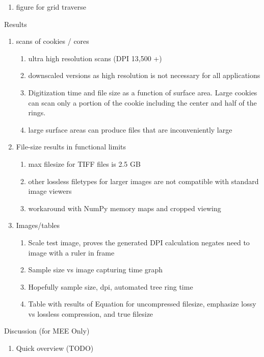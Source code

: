 \documentclass{article}
\begin{document}
\begin{outline}[enumerate]
\begin{enumerate}
\begin{enumerate}
\begin{enumerate}
				\item figure for grid traverse
				\end{enumerate}
			\end{enumerate}
		\end{enumerate}
\item Results
	\begin{enumerate}
	\item scans of cookies / cores
		\begin{enumerate}
		\item ultra high resolution scans (DPI 13,500 +)
		\item downscaled versions as high resolution is not necessary for all applications
		\item Digitization time and file size as a function of surface area. Large cookies can scan only a portion of the cookie including the center and half of the rings.
		\item large surface areas can produce files that are inconveniently large
		\end{enumerate}
	\item File-size results in functional limits 
		\begin{enumerate}
		\item max filesize for TIFF files is 2.5 GB
		\item other lossless filetypes for larger images are not compatible with standard image viewers
		\item workaround with NumPy memory maps and cropped viewing 
		\end{enumerate}
	\item Images/tables	
		\begin{enumerate}
		\item Scale test image, proves the generated DPI calculation negates need to image with a ruler in frame
		\item Sample size vs image capturing time graph
		\item Hopefully sample size, dpi, automated tree ring time
		\item Table with results of Equation for uncompressed filesize, emphasize lossy vs lossless compression, and true filesize %
		\end{enumerate}
	\end{enumerate}
\item Discussion (for MEE Only) 
	\begin{enumerate}
	\item Quick overview (TODO)

\end{enumerate}
\end{outline}
\end{document}
